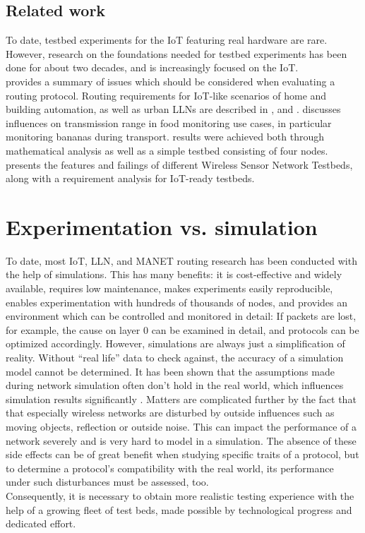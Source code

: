 \documentclass{acm_proc_article-sp}
\begin{document}
\subsection{Related work}
\label{subsec:related_work}
To date, testbed experiments for the IoT featuring real hardware are rare. However, research on the foundations needed for testbed experiments has been done for about two decades, and is increasingly focused on the IoT.\\
\cite{RFC-2501} provides a summary of issues which should be considered when evaluating a routing protocol. Routing requirements for IoT-like scenarios of home and building automation, as well as urban \glspl{LLN} are described in \cite{RFC-5826}, \cite{RFC-5867} and \cite{RFC-5548}.
\cite{food_monitoring} discusses influences on transmission range in food monitoring use cases, in particular monitoring bananas during transport. results were achieved both through mathematical analysis as well as a simple testbed consisting of four nodes.
\cite{testbed-survey} presents the features and failings of different Wireless Sensor Network Testbeds, along with a requirement analysis for IoT-ready testbeds.

\section{Experimentation vs. simulation}
\label{sec:simulation_cons}
To date, most IoT, \gls{LLN}, and \gls{MANET} routing research has been conducted with the help of simulations. This has many benefits: it is cost-effective and widely available, requires low maintenance, makes experiments easily reproducible, enables experimentation with hundreds of thousands of nodes,
 and provides an environment which can be controlled and monitored in detail: If packets are lost, for example, the cause on layer 0 can be examined in detail, and protocols can be optimized accordingly.
However, simulations are always just a simplification of reality. Without ``real life'' data to check against, the accuracy of a simulation model cannot be determined. It has been shown that the assumptions made during network simulation often don't hold in the real world, which influences simulation results significantly \cite{mistaken-axioms}.
Matters are complicated further by the fact that that especially wireless networks are disturbed by outside influences such as moving objects, reflection or outside noise. This can impact the performance of a network severely and is very hard to model in a simulation. The absence of these side effects can be of great benefit when studying specific traits of a protocol, but to determine a protocol's compatibility with the real world, its performance under such disturbances must be assessed, too.\\
Consequently, it is necessary to obtain more realistic testing experience with the help of a growing fleet of test beds, made possible by technological progress and dedicated effort.
\end{document}
